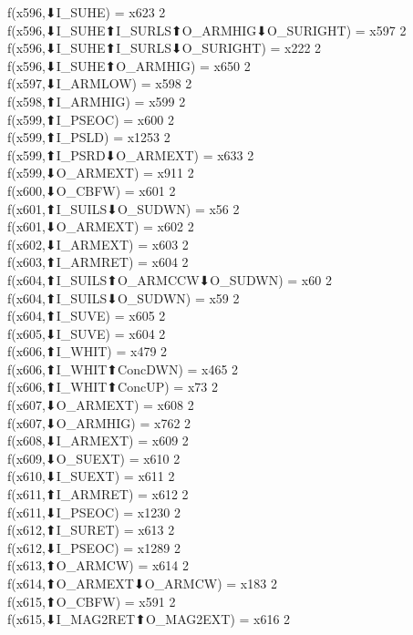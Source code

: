 f(x596,⬇I_SUHE) = x623 {2} \\
f(x596,⬇I_SUHE⬆I_SURLS⬆O_ARMHIG⬇O_SURIGHT) = x597 {2} \\
f(x596,⬇I_SUHE⬆I_SURLS⬇O_SURIGHT) = x222 {2} \\
f(x596,⬇I_SUHE⬆O_ARMHIG) = x650 {2} \\
f(x597,⬇I_ARMLOW) = x598 {2} \\
f(x598,⬆I_ARMHIG) = x599 {2} \\
f(x599,⬆I_PSEOC) = x600 {2} \\
f(x599,⬆I_PSLD) = x1253 {2} \\
f(x599,⬆I_PSRD⬇O_ARMEXT) = x633 {2} \\
f(x599,⬇O_ARMEXT) = x911 {2} \\
f(x600,⬇O_CBFW) = x601 {2} \\
f(x601,⬆I_SUILS⬇O_SUDWN) = x56 {2} \\
f(x601,⬇O_ARMEXT) = x602 {2} \\
f(x602,⬇I_ARMEXT) = x603 {2} \\
f(x603,⬆I_ARMRET) = x604 {2} \\
f(x604,⬆I_SUILS⬆O_ARMCCW⬇O_SUDWN) = x60 {2} \\
f(x604,⬆I_SUILS⬇O_SUDWN) = x59 {2} \\
f(x604,⬆I_SUVE) = x605 {2} \\
f(x605,⬇I_SUVE) = x604 {2} \\
f(x606,⬆I_WHIT) = x479 {2} \\
f(x606,⬆I_WHIT⬆ConcDWN) = x465 {2} \\
f(x606,⬆I_WHIT⬆ConcUP) = x73 {2} \\
f(x607,⬇O_ARMEXT) = x608 {2} \\
f(x607,⬇O_ARMHIG) = x762 {2} \\
f(x608,⬇I_ARMEXT) = x609 {2} \\
f(x609,⬇O_SUEXT) = x610 {2} \\
f(x610,⬇I_SUEXT) = x611 {2} \\
f(x611,⬆I_ARMRET) = x612 {2} \\
f(x611,⬇I_PSEOC) = x1230 {2} \\
f(x612,⬆I_SURET) = x613 {2} \\
f(x612,⬇I_PSEOC) = x1289 {2} \\
f(x613,⬆O_ARMCW) = x614 {2} \\
f(x614,⬆O_ARMEXT⬇O_ARMCW) = x183 {2} \\
f(x615,⬆O_CBFW) = x591 {2} \\
f(x615,⬇I_MAG2RET⬆O_MAG2EXT) = x616 {2} \\
